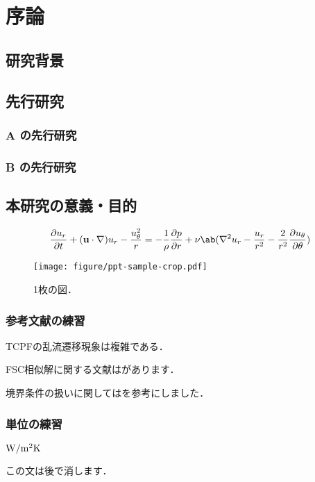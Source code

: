 
\chapter{序論}
\label{ch:introduction}


\section{研究背景}
\label{sec:background}


\section{先行研究}
\label{sec:previous}

\subsection{A の先行研究}
\label{ssec:previous_A}

\subsection{B の先行研究}
\label{ssec:previous_B}


\section{本研究の意義・目的}
\label{sec:objective}

\begin{equation}
    \pdv{u_r}{t} + (\mathbf{u}\cdot\nabla)u_r - \frac{u_\theta^2}{r} = 
    -\frac{1}{\rho}\pdv{p}{r} + \nu\ab(\nabla^2 u_r - \frac{u_r}{r^2} - \frac{2}{r^2}\pdv{u_\theta}{\theta})
    \label{eq:NSr2}
\end{equation}

\begin{figure}[tp]
    \centering
    \texttt{[image: figure/ppt-sample-crop.pdf]}
    \caption{1枚の図．}
    \label{fig:one_figure}
\end{figure}

\subsection{参考文献の練習}
\label{ssec:bibtex}

\citet{Matsukawa:PoF2022}

TCPFの乱流遷移現象は複雑である\citep{Matsukawa:PoF2022}．

FSC相似解に関する文献は\citet{Liu:2021}があります．

境界条件の扱いに関しては\citet{Guastoni:2021}を参考にしました．

\subsection{単位の練習}
\label{ssec:unit}

$\si[per-mode=symbol]{\watt\per{\square\meter\kelvin}}$

この文は後で消します．